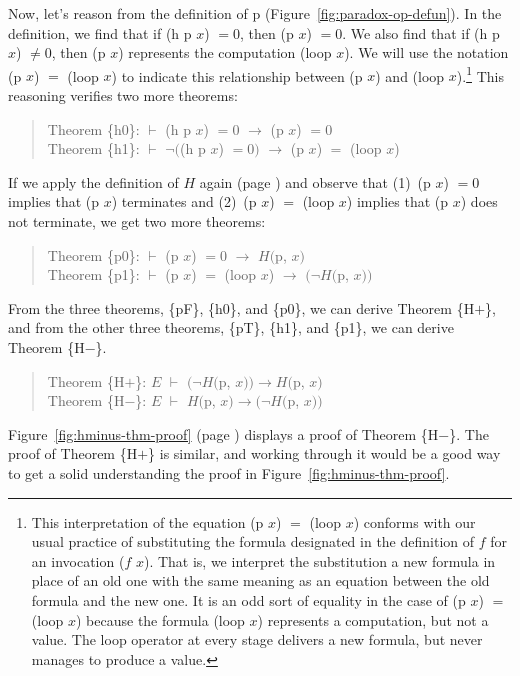 Now, let's reason from the definition of p (Figure~\ref{fig:paradox-op-defun}).
In the definition, we find that if (h p $x$) $= 0$, then (p $x$) $=0 $.
We also find that if (h p $x$) $\neq 0$, then (p $x$) represents
the computation (loop $x$). We will use the notation (p $x$) $=$ (loop $x$)
to indicate this relationship between (p $x$) and (loop $x$).\footnote{This
\label{caveat:equality-for-loop}
interpretation of the equation (p $x$) $=$ (loop $x$) conforms with
our usual practice of substituting the formula designated in the
definition of $f$ for an invocation ($f$ $x$).
That is, we interpret the substitution a new formula
in place of an old one with the same meaning as an equation
between the old formula and the new one.
It is an odd sort of equality in the case of (p $x$) $=$ (loop $x$)
because the formula (loop $x$) represents a computation, but not a value.
The loop operator at every stage delivers a new formula,
but never manages to produce a value.}
This reasoning verifies two more theorems:
\begin{quote}
Theorem \{h0\}: $\vdash$  (h p $x$) $=0$  $\rightarrow$ (p $x$) $= 0$    \\
Theorem \{h1\}: $\vdash$  $\neg($(h p $x$) $= 0)$ $\rightarrow$ (p $x$) $=$ (loop $x$)
\end{quote}

If we apply the definition of $H$ again (page \pageref{def:predicate-H})
and observe that (1)~(p $x$) $= 0$ implies that (p $x$) terminates and
(2)~(p $x$) $=$ (loop $x$) implies that (p $x$) does not terminate,
we get two more theorems:
\begin{quote}
Theorem \{p0\}: $\vdash$  (p $x$) $= 0$ $\rightarrow$ $H($p, $x)$ \\
Theorem \{p1\}: $\vdash$  (p $x$) $=$ (loop $x$) $\rightarrow$ $(\neg H($p, $x))$
\end{quote}

From the three theorems, \{pF\}, \{h0\}, and \{p0\},
we can derive Theorem \{H$+$\}, and
from the other three theorems, \{pT\}, \{h1\}, and \{p1\},
we can derive
Theorem \{H$-$\}.
\begin{quote}
Theorem \{H$+$\}: $E$ $\vdash$ $(\neg H($p, $x))\rightarrow H($p, $x)$ \\
Theorem \{H$-$\}: $E$ $\vdash$ $H($p, $x) \rightarrow(\neg H($p, $x))$
\end{quote}

Figure~\ref{fig:hminus-thm-proof} (page \pageref{fig:hminus-thm-proof}) displays
a proof of Theorem \{H$-$\}.
The proof of Theorem \{H$+$\} is similar, and working through it would be
a good way to get a solid understanding the proof in Figure~\ref{fig:hminus-thm-proof}.

